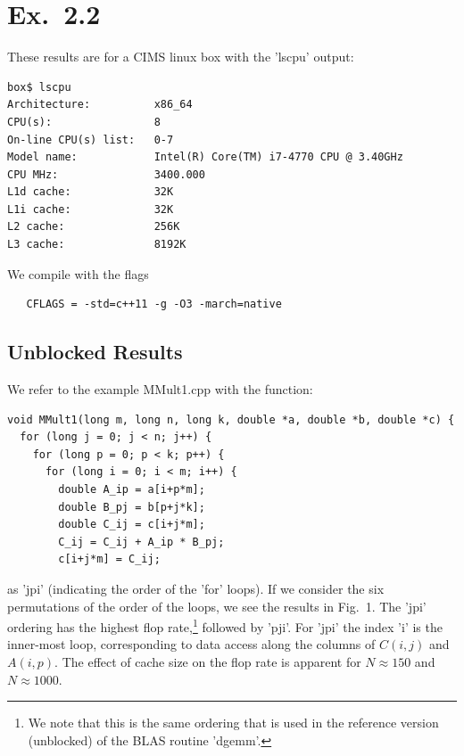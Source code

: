 \documentclass[12pt]{article}
\begin{document}
\section*{Ex.~2.2}

These results are for a CIMS linux box with the 'lscpu' output:
\begin{singlespace}
\begin{verbatim}
box$ lscpu
Architecture:          x86_64
CPU(s):                8
On-line CPU(s) list:   0-7
Model name:            Intel(R) Core(TM) i7-4770 CPU @ 3.40GHz
CPU MHz:               3400.000
L1d cache:             32K
L1i cache:             32K
L2 cache:              256K
L3 cache:              8192K
\end{verbatim}
\end{singlespace}

\noindent We compile with the flags 
\begin{verbatim}
   CFLAGS = -std=c++11 -g -O3 -march=native
\end{verbatim}

\subsection*{Unblocked Results}

We refer to the example \rm{MMult1.cpp} with the function:
\begin{singlespace}
\begin{verbatim}
void MMult1(long m, long n, long k, double *a, double *b, double *c) {
  for (long j = 0; j < n; j++) {
    for (long p = 0; p < k; p++) {
      for (long i = 0; i < m; i++) {
        double A_ip = a[i+p*m];
        double B_pj = b[p+j*k];
        double C_ij = c[i+j*m];
        C_ij = C_ij + A_ip * B_pj;
        c[i+j*m] = C_ij;
\end{verbatim}
\end{singlespace}
\noindent as 'jpi' (indicating the order of the 'for' loops).
If we consider the six permutations of the order of the loops,
we see the results in Fig.~1. The 'jpi' ordering has the highest
flop rate,\footnote{We
note that this is the same ordering
that is used in the reference version (unblocked) of the BLAS routine
'dgemm'\cite{dgemm}.} followed by 'pji'. For 'jpi' the index 'i' is the inner-most
loop, corresponding to data access along 
the columns of $C(i,j)$ and $A(i,p)$.
The effect of cache size on the flop rate
is apparent for $N \approx 150$ and $N \approx 1000$.
\end{document}
